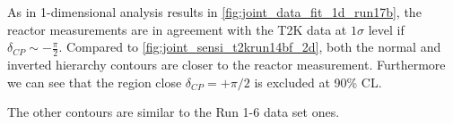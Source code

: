 As in 1-dimensional analysis results
in \cref{fig:joint_data_fit_1d_run17b}, the reactor measurements are 
in agreement with the T2K data at $1\sigma$ level if $\delta_{CP} \sim - \frac{\pi}{2}$. 
Compared to \cref{fig:joint_sensi_t2krun14bf_2d}, both the normal and inverted 
hierarchy contours are closer to the reactor measurement.
Furthermore we can see that the region close $\delta_{CP} = + \pi/2$ is excluded at 90\% CL.

The other contours are similar to the Run 1-6 data set ones.


